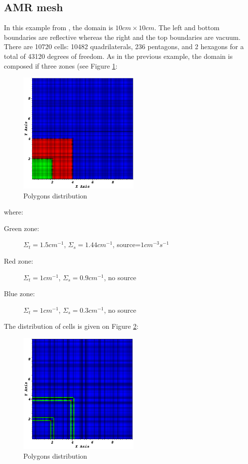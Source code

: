 \subsection{AMR mesh}
In this example from \cite{mip}, the domain is $10cm\times 10cm$. The left and bottom
boundaries are reflective whereas the right and the top boundaries are vacuum. 
There are 10720 cells: 10482 quadrilaterals, 236 pentagons,
and 2 hexagons for a total of 43120 degrees of freedom. 
As in the previous example, the domain is composed if three zones (see Figure
\ref{fig_zone_amr}:
\begin{figure}[H]
  \centering
  \includegraphics[width=6cm]{./Dsa/zone_amr}
  \caption{Polygons distribution}
  \label{fig_zone_amr}
\end{figure}
where:
\begin{description}
  \item[Green zone:] $\Sigma_t=1.5cm^{-1}$, $\Sigma_s=1.44cm^{-1}$,
    source=$1cm^{-3}s^{-1}$
  \item[Red zone:] $\Sigma_t=1cm^{-1}$, $\Sigma_s=0.9cm^{-1}$, no source
  \item[Blue zone:] $\Sigma_t=1cm^{-1}$, $\Sigma_s=0.3cm^{-1}$, no source
\end{description}
The distribution of cells is given on Figure \ref{fig_distr}:
\begin{figure}[H]
  \centering
  \includegraphics[width=6cm]{./Dsa/polygon_amr}
  \caption{Polygons distribution}
  \label{fig_distr}
\end{figure}

